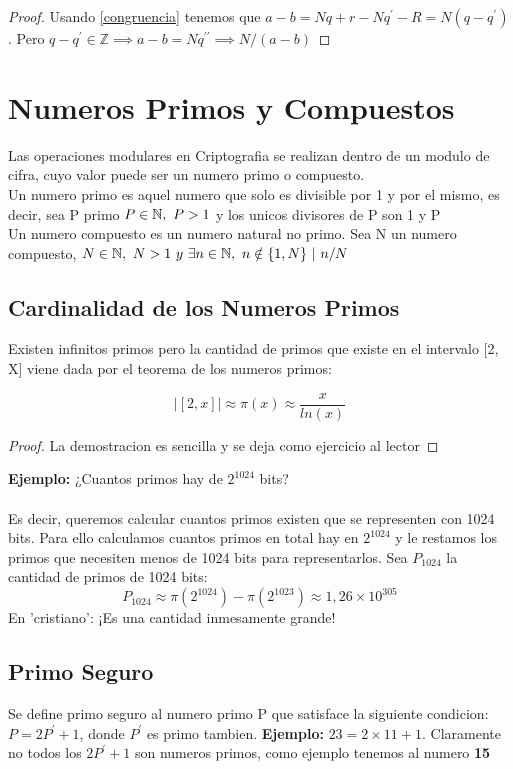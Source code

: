 \documentclass{article}
\begin{document}
\begin{proof}
    Usando \ref{congruencia} tenemos que $a-b = Nq + r -Nq^{\prime} - R = N(q-q^{\prime})$. Pero $q-q^\prime \in \mathbb{Z} \implies a-b = Nq^{\prime \prime} \implies N/(a-b)$
\end{proof}

\section{Numeros Primos y Compuestos}
Las operaciones modulares en Criptografia se realizan dentro de un modulo de cifra, cuyo
valor puede ser un numero primo o compuesto.\\

Un numero primo es aquel numero que solo es divisible por 1 y por el mismo,
es decir, sea P primo $P \in \mathbb{N}, \,\, P > 1$ y los unicos divisores de P son 1 y P\\

Un numero compuesto es un numero natural no primo. Sea N un numero compuesto,
$N \in \mathbb{N}, \,\, N > 1 \,\, y \,\, \exists n \in \mathbb{N}, \,\, n \notin \{1,N\}
\,\, \vert \,\, n/N$

\subsection{Cardinalidad de los Numeros Primos}
Existen infinitos primos pero la cantidad de primos que existe en el intervalo [2, X]
viene dada por el teorema de los numeros primos:
\begin{theorem}
    $$|[2,x]| \approx \pi(x) \approx \frac{x}{ln(x)}$$
\end{theorem}

\begin{proof}
    La demostracion es sencilla y se deja como ejercicio al lector
\end{proof}

\textbf{Ejemplo:} ¿Cuantos primos hay de $2^{1024}$ bits?\\\\
Es decir, queremos calcular cuantos primos existen que se representen con 1024 bits.
Para ello calculamos cuantos primos en total hay en $2^{1024}$ y le restamos los
primos que necesiten menos de 1024 bits para representarlos. Sea $P_{1024}$ la cantidad
de primos de 1024 bits:
$$P_{1024} \approx \pi{(2^{1024})} - \pi{(2^{1023})} \approx 1,26 \times 10^{305}$$
En 'cristiano': ¡Es una cantidad inmesamente grande!

\subsection{Primo Seguro}
Se define primo seguro al numero primo P que satisface la siguiente condicion:
$P = 2P^{'} + 1$, donde $P^{'}$ es primo tambien. \textbf{Ejemplo:} $23 = 2 \times 11 + 1$. Claramente no
todos los $2P^{'} + 1$ son numeros primos, como ejemplo tenemos
al numero \textbf{15}
\end{document}
